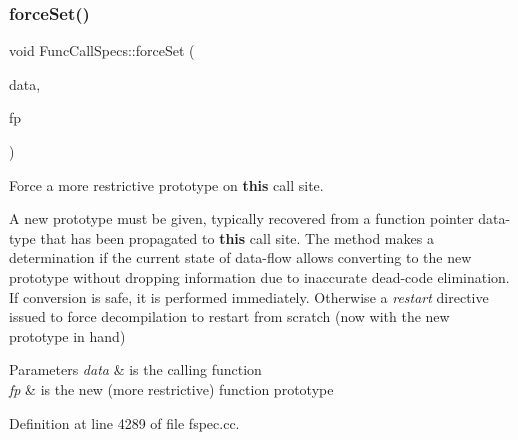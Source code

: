 \subsubsection{\texorpdfstring{forceSet()}{forceSet()}}
{\footnotesize\ttfamily void Func\+Call\+Specs\+::force\+Set (\begin{DoxyParamCaption}\item[{\mbox{\hyperlink{class_funcdata}{Funcdata}} \&}]{data,  }\item[{const \mbox{\hyperlink{class_func_proto}{Func\+Proto}} \&}]{fp }\end{DoxyParamCaption})}



Force a more restrictive prototype on {\bfseries{this}} call site. 

A new prototype must be given, typically recovered from a function pointer data-\/type that has been propagated to {\bfseries{this}} call site. The method makes a determination if the current state of data-\/flow allows converting to the new prototype without dropping information due to inaccurate dead-\/code elimination. If conversion is safe, it is performed immediately. Otherwise a {\itshape restart} directive issued to force decompilation to restart from scratch (now with the new prototype in hand) 
\begin{DoxyParams}{Parameters}
{\em data} & is the calling function \\
\hline
{\em fp} & is the new (more restrictive) function prototype \\
\hline
\end{DoxyParams}


Definition at line 4289 of file fspec.\+cc.

